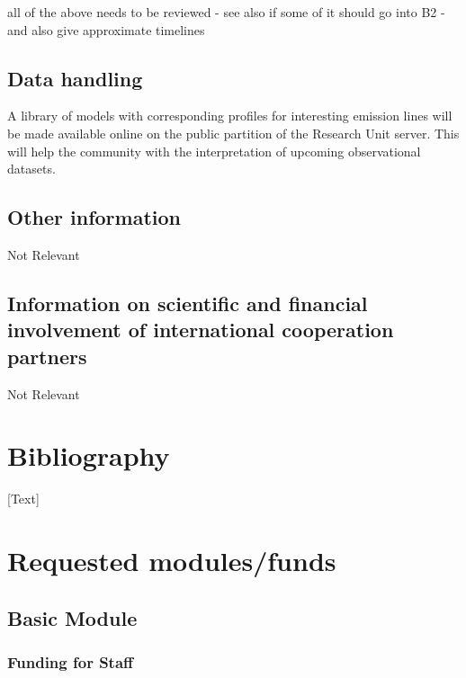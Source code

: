 \documentclass[10pt,fleqn,twoside]{article}
\newcommand{\Tcol}{\color{blue}}
\begin{document}
{\color{red} all of the above needs to be reviewed - see also if some
  of it should go into B2 - and also give approximate timelines}


\subsection{\Tcol Data handling}

A library of models with corresponding profiles for interesting
emission lines will be made available online on the public partition
of the Research Unit server. This will help the community with the
interpretation of upcoming observational datasets. 

\subsection{\Tcol Other information}

Not Relevant

\subsection{\Tcol Information on scientific and financial involvement of international cooperation partners}

Not Relevant

\section{\Tcol Bibliography}

[Text]

\section{\Tcol Requested modules/funds}
\renewcommand{\leftmark}{\sc  Requested modules/funds}

\subsection{\Tcol Basic Module}

\subsubsection{\Tcol Funding for Staff}
\end{document}
